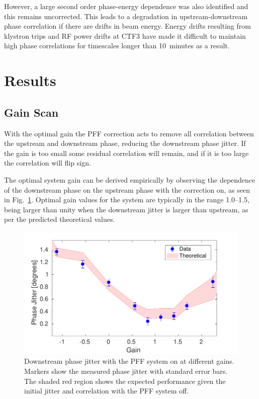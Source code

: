 \documentclass[%
 reprint,
superscriptaddress,
 amsmath,amssymb,
 prl,
]{revtex4-1}
\begin{document}
However, a large second order phase-energy dependence was also identified and 
this remains uncorrected. This leads to a degradation in upstream-downstream 
phase correlation if there are drifts in beam energy. Energy drifts resulting 
from klystron trips and RF power drifts at CTF3 have made it difficult to 
maintain high phase correlations for timescales longer than 10~minutes as a 
result.

\section{\label{s:results}Results}

\subsection{\label{ss:gScan}Gain Scan}

With the optimal gain the PFF correction acts to remove all correlation between 
the upstream and downstream phase, reducing the downstream phase jitter. If the 
gain is too small some residual correlation will remain, and if it is too large 
the correlation will flip sign. 

The optimal system gain can be derived empirically by observing the dependence 
of the downstream phase on the upstream phase with the correction on, as seen 
in Fig.~\ref{fig:gScan}. Optimal gain values for the system are typically in 
the range 1.0--1.5, being larger than unity when the downstream jitter is 
larger than upstream, as per the predicted theoretical values. 

\begin{figure}
\includegraphics[width=\columnwidth]{figs/gScan}%
\caption{\label{fig:gScan}Downstream phase jitter with the PFF system on at 
different gains. Markers show the measured phase jitter with standard error 
bars. The shaded red region shows the expected performance given the initial 
jitter and correlation with the PFF system off.}
\end{figure}
\end{document}
